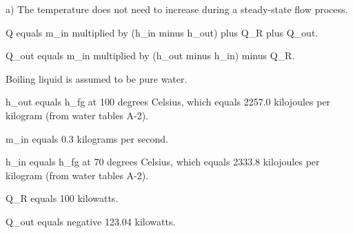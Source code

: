 a) The temperature does not need to increase during a steady-state flow process.  

Q equals m_in multiplied by (h_in minus h_out) plus Q_R plus Q_out.  

Q_out equals m_in multiplied by (h_out minus h_in) minus Q_R.  

Boiling liquid is assumed to be pure water.  

h_out equals h_fg at 100 degrees Celsius, which equals 2257.0 kilojoules per kilogram (from water tables A-2).  

m_in equals 0.3 kilograms per second.  

h_in equals h_fg at 70 degrees Celsius, which equals 2333.8 kilojoules per kilogram (from water tables A-2).  

Q_R equals 100 kilowatts.  

Q_out equals negative 123.04 kilowatts.